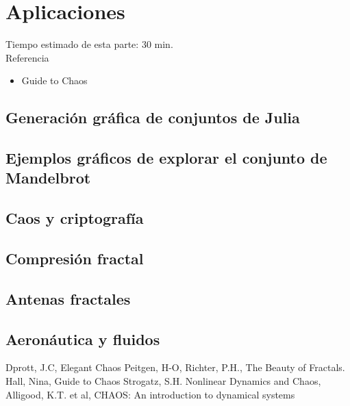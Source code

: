 
\section{Aplicaciones}
Tiempo estimado de esta parte: 30 min.\\
Referencia
\begin{itemize}
\item Guide to Chaos
\end{itemize}
\subsection{Generación gráfica de conjuntos de Julia}
\subsection{Ejemplos gráficos de explorar el conjunto de Mandelbrot}
\subsection{Caos y criptografía}
\subsection{Compresión fractal}
\subsection{Antenas fractales}
\subsection{Aeronáutica y fluidos}

\newpage

\begin{thebibliography}{1}
Dprott, J.C, Elegant Chaos
Peitgen, H-O, Richter, P.H., The Beauty of Fractals.
Hall, Nina, Guide to Chaos
Strogatz, S.H. Nonlinear Dynamics and Chaos,
Alligood, K.T. et al, CHAOS: An introduction to dynamical systems
\end{thebibliography}

